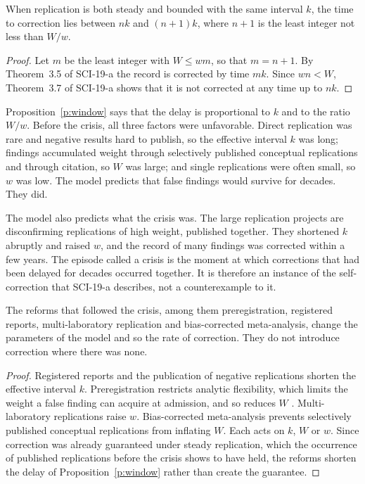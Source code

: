 \documentclass{situationist-preprint}
\begin{document}
\begin{proposition}\label{p:window}
When replication is both steady and bounded with the same interval $k$, the time to correction lies between $nk$ and $(n+1)k$, where $n+1$ is the least integer not less than $W/w$.
\end{proposition}

\begin{proof}
Let $m$ be the least integer with $W\le wm$, so that $m=n+1$. By Theorem~3.5 of SCI-19-a the record is corrected by time $mk$. Since $wn<W$, Theorem~3.7 of SCI-19-a shows that it is not corrected at any time up to $nk$.
\end{proof}

Proposition~\ref{p:window} says that the delay is proportional to $k$ and to the ratio $W/w$. Before the crisis, all three factors were unfavorable. Direct replication was rare and negative results hard to publish, so the effective interval $k$ was long; findings accumulated weight through selectively published conceptual replications and through citation, so $W$ was large; and single replications were often small, so $w$ was low. The model predicts that false findings would survive for decades. They did.

The model also predicts what the crisis was. The large replication projects are disconfirming replications of high weight, published together. They shortened $k$ abruptly and raised $w$, and the record of many findings was corrected within a few years. The episode called a crisis is the moment at which corrections that had been delayed for decades occurred together. It is therefore an instance of the self-correction that SCI-19-a describes, not a counterexample to it.

\begin{proposition}\label{p:rate}
The reforms that followed the crisis, among them preregistration, registered reports, multi-laboratory replication and bias-corrected meta-analysis, change the parameters of the model and so the rate of correction. They do not introduce correction where there was none.
\end{proposition}

\begin{proof}
Registered reports and the publication of negative replications shorten the effective interval $k$. Preregistration restricts analytic flexibility, which limits the weight a false finding can acquire at admission, and so reduces $W$ \citep{Nosek2018}. Multi-laboratory replications raise $w$. Bias-corrected meta-analysis prevents selectively published conceptual replications from inflating $W$. Each acts on $k$, $W$ or $w$. Since correction was already guaranteed under steady replication, which the occurrence of published replications before the crisis shows to have held, the reforms shorten the delay of Proposition~\ref{p:window} rather than create the guarantee.
\end{proof}
\end{document}
